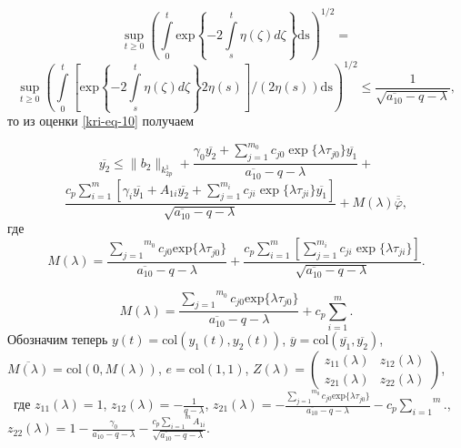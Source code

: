 \begin{equation*}
\sup\limits_{t\ge 0}\left(\overset t{\underset 0{\int
}}\text{exp}\left\{-2\overset t{\underset s{\int }}\eta (\zeta )\mathit{d\zeta
}\right\}\text{ds}\right)^{1/2}=
\end{equation*}
\begin{equation*}
\sup\limits_{t\ge 0}\left(\overset
t{\underset 0{\int }}\left[\text{exp}\left\{-2\overset t{\underset s{\int }}\eta (\zeta )\mathit{d\zeta }\right\}2\eta
(s)\right]/(2\eta (s))\text{ds}\right)^{1/2}\le \frac 1{\sqrt{\overline{a_{10}}-q-\lambda
}},
\end{equation*}
то из оценки \eqref{kri-eq-10} получаем

\begin{equation*}
\overline{y_2} \leq \|b_2\|_{k^1_{2p}} + \frac{\gamma_0\overline{y_2}+\sum\limits_{j=1}^{m_0} c_{j0}\exp \{\lambda\tau_{j0} \} \overline{y_1}}{\overline{a_{10}}-q-\lambda} +
\end{equation*}
\begin{equation}\label{kri-eq-11}
\frac{c_p \sum\limits_{i=1}^{m} \left[ \gamma_i\overline{y_1}+A_{1i}\overline{y_2}+\sum\limits_{j=1}^{m_i} c_{ji}\exp\{\lambda\tau_{ji} \} \overline{y_1} \right]}{\sqrt{\overline{a_{10}}-q-\lambda}} + M(\lambda)\overline{\overline{\varphi}},
\end{equation}
где
\begin{equation*}
M(\lambda )=\frac{\overset{m_0}{\underset{j=1}{\sum }}c_{\mathit{j0}}\text{exp}\{\text{$\lambda \tau
		$}_{\mathit{j0}}\}}{\overline{a_{10}}-q-\lambda }+ \frac{c_p \sum\limits_{i=1}^{m}\left[\sum\limits_{j=1}^{m_i} c_{ji}\exp\{\lambda\tau_{ji} \}\right]}{\sqrt{\overline{a_{10}}-q-\lambda}}.
\end{equation*}

\begin{equation*}
M(\lambda )=\frac{\overset{m_0}{\underset{j=1}{\sum }}c_{\mathit{j0}}\text{exp}\{\text{$\lambda \tau
$}_{\mathit{j0}}\}}{\overline{a_{10}}-q-\lambda }+c_p\overset m{\underset{i=1}{\sum }}.
\end{equation*}
Обозначим теперь  $y(t)=\text{col}(y_1(t),y_2(t))$,  $\overline
y=\text{col}(\overline{y_1},\overline{y_2})$,  $\overline{M(\lambda
)}=\text{col}(0,M(\lambda ))$,  $e=\text{col}(1,1)$,  $Z(\lambda
)=\left(\begin{matrix}z_{11}(\lambda )&z_{12}(\lambda )\\z_{21}(\lambda )&z_{22}(\lambda )\end{matrix}\right)$, \ где
$z_{11}(\lambda )=1$,  $z_{12}(\lambda )=-\frac 1{q-\lambda }$,  $z_{21}(\lambda
)=-\frac{\overset{m_0}{\underset{j=1}{\sum }}c_{\mathit{j0}}\text{exp}\{\text{$\lambda \tau
$}_{\mathit{j0}}\}}{\overline{a_{10}}-q-\lambda }-c_p\overset m{\underset{i=1}{\sum }}.$, \  $z_{22}(\lambda
)=1-\frac{\gamma _0}{\overline{a_{10}}-q-\lambda }-\frac{c_p\overset m{\underset{i=1}{\sum
}}A_{1i}}{\sqrt{\overline{a_{10}}-q-\lambda }}.$

